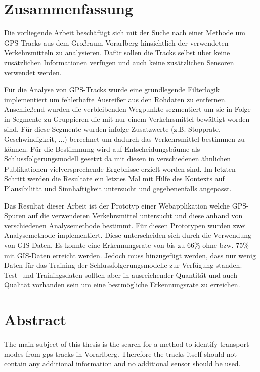 \section*{Zusammenfassung}

Die vorliegende Arbeit beschäftigt sich mit der Suche nach einer Methode um GPS-Tracks  aus dem Großraum Vorarlberg hinsichtlich der verwendeten Verkehrsmitteln zu analysieren. Dafür sollen die Tracks selbst über keine zusätzlichen Informationen verfügen und auch keine zusätzlichen Sensoren verwendet werden.

Für die Analyse von GPS-Tracks wurde eine grundlegende Filterlogik implementiert um fehlerhafte Ausreißer aus den Rohdaten zu entfernen. Anschließend wurden die verbleibenden Wegpunkte segmentiert um sie in Folge in Segmente zu Gruppieren die mit nur einem Verkehrsmittel bewältigt worden sind. Für diese Segmente wurden infolge Zusatzwerte (z.B. Stopprate, Geschwindigkeit, ...) berechnet um dadurch das Verkehrsmittel bestimmen zu können. Für die Bestimmung wird auf Entscheidungsbäume als Schlussfolgerungsmodell gesetzt da mit diesen in verschiedenen ähnlichen Publikationen vielversprechende Ergebnisse erzielt worden sind. Im letzten Schritt werden die Resultate ein letztes Mal mit Hilfe des Kontexts auf Plausibilität und Sinnhaftigkeit untersucht und gegebenenfalls angepasst.

Das Resultat dieser Arbeit ist der Prototyp einer Webapplikation welche GPS-Spuren auf die verwendeten Verkehrsmittel untersucht und diese anhand von verschiedenen Analysemethode bestimmt. Für diesen Prototypen wurden zwei Analysemethode implementiert. Diese unterscheiden sich durch die Verwendung von GIS-Daten. Es konnte eine Erkennungsrate von bis zu 66\% ohne bzw. 75\% mit GIS-Daten erreicht werden. Jedoch muss hinzugefügt werden, dass nur wenig Daten für das Training der Schlussfolgerungsmodelle zur Verfügung standen. Test- und Trainingsdaten sollten aber  in ausreichender Quantität und auch Qualität vorhanden sein um eine bestmögliche Erkennungsrate zu erreichen.

\afterpage{\blankpage}
\newpage

\section*{Abstract}

The main subject of this thesis is the search for a method to identify transport modes from gps tracks in Vorarlberg. Therefore the tracks itself should not contain any additional information and no additional sensor should be used.

